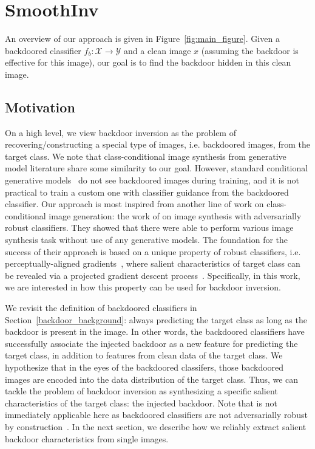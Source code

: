 \documentclass[10pt,twocolumn,letterpaper]{article}
\begin{document}



\section{SmoothInv}
An overview of our approach is given in Figure~\ref{fig:main_figure}. Given a backdoored classifier $f_{b}: \mathcal{X}\rightarrow\mathcal{Y}$ and a clean image $x$ (assuming the backdoor is effective for this image), our goal is to find the backdoor hidden in this clean image.

\subsection{Motivation}
On a high level, we view backdoor inversion as the problem of recovering/constructing a special type of images, i.e. backdoored images, from the target class. We note that class-conditional image synthesis from generative model literature share some similarity to our goal. However, standard conditional generative models~\cite{mirza2014cgan} do not see backdoored images during training, and it is not practical to train a custom one with classifier guidance from the backdoored classifier. Our approach is most inspired from another line of work on class-conditional image generation: the work of \cite{shibani2019synthesis,Zhu_2021_ICCV} on image synthesis with adversarially robust classifiers. They showed that there were able to perform various image synthesis task without use of any generative models. The foundation for the success of their approach is based on a unique property of robust classifiers, i.e. perceptually-aligned gradients~\cite{dimitris2018odds,kaur2019perceptual}, where salient characteristics of target class can be revealed via a projected gradient descent process~\cite{pgd_madry}. Specifically, in this work, we are interested in how this property can be used for backdoor inversion.

We revisit the definition of backdoored classifiers in Section~\ref{backdoor_background}: always predicting the target class as long as the backdoor is present in the image. In other words, the backdoored classifiers have successfully associate the injected backdoor as a new feature for predicting the target class, in addition to features from clean data of the target class. We hypothesize that in the eyes of the backdoored classifers, those backdoored images are encoded into the data distribution of the target class. Thus, we can tackle the problem of backdoor inversion as synthesizing a specific salient characteristics of the target class: the injected backdoor. Note that \cite{shibani2019synthesis} is not immediately applicable here as backdoored classifiers are not adversarially robust by construction~\cite{badnet}. In the next section, we describe how we reliably extract salient backdoor characteristics from single images. 
\end{document}

